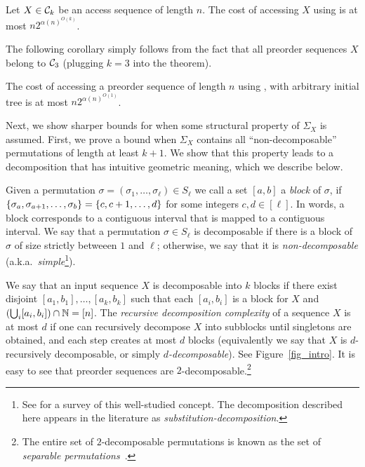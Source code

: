\begin{theorem} 
\label{thm:pattern-avoidance}
Let $X \in {\mathcal{C}}_k$ be an access sequence of length $n$.  
The cost of accessing $X$ using \greedy is at most $n 2^{\alpha(n)^{O(k)}}$. 
\end{theorem} 


The following corollary simply follows from the fact that all preorder sequences $X$ belong to ${\mathcal{C}}_3$ (plugging $k=3$ into the theorem). 

\begin{corollary} 
\label{cor:trav1}
The cost of accessing a preorder sequence of length $n$ using \greedy, with arbitrary initial tree is at most $n2^{\alpha(n)^{O(1)}}$.
\end{corollary} 

Next, we show sharper bounds for \greedy when some structural property of $\Sigma_X$ is assumed. 
First, we prove a bound when $\Sigma_X$ contains all ``non-decomposable'' permutations of length at least $k+1$. We show that this property leads to a decomposition that has intuitive geometric meaning, which we describe below.  

Given a permutation $\sigma =(\sigma_1,\ldots, \sigma_{\ell}) \in S_{\ell}$ we call a set $[a,b]$ a \emph{block} of $\sigma$, if $\{\sigma_a, \sigma_{a+1}, \dots, \sigma_b\} = \left\{ c,c+1,\ldots, d \right\}$ for some integers $c, d \in [\ell]$.
In words, a block corresponds to a contiguous interval that is mapped to a contiguous interval.
We say that a permutation $\sigma \in S_\ell$ is decomposable if there is a block of $\sigma$ of size strictly betweeen $1$ and $\ell$; otherwise, we say that it is \emph{non-decomposable} (a.k.a.\ \emph{simple}\footnote{See \cite{brignall} for a survey of this well-studied concept. The decomposition described here appears in the literature as \emph{substitution-decomposition}.}).


We say that an input sequence $X$ is decomposable into $k$ blocks if there exist disjoint $[a_1,b_1],\ldots,[a_k, b_k]$ such that each $[a_i, b_i]$ is a block for $X$ and $\left( \bigcup_i [a_i, b_i]\right) \cap \mathbb N = [n]$. 
The {\em recursive decomposition complexity} of a sequence $X$ is at most $d$ if one can recursively decompose $X$ into subblocks until singletons are obtained, and each step creates at most $d$ blocks (equivalently we say that $X$ is $d$-recursively decomposable, or simply $d$\emph{-decomposable}). See Figure~\ref{fig_intro}.
It is easy to see that preorder sequences are $2$-decomposable.\footnote{The entire set of $2$-decomposable permutations is known as the set of {\em separable permutations}~\cite{separable}.}
 
